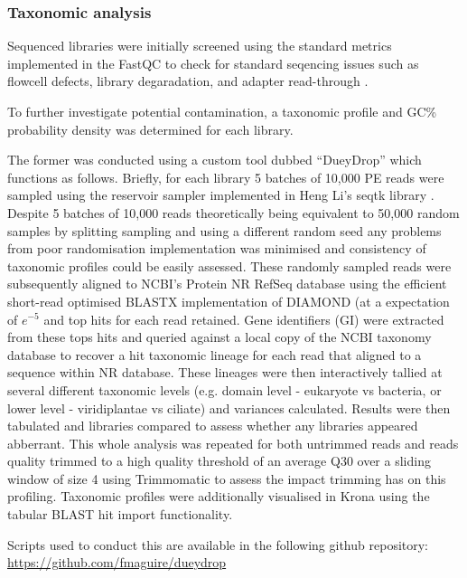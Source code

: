 \subsubsection{Taxonomic analysis}
Sequenced libraries were initially screened using the standard
metrics implemented in the FastQC to check for standard seqencing issues
such as flowcell defects, library degaradation, and adapter read-through \citep{fastqc}.

To further investigate potential contamination, a taxonomic
profile and GC\% probability density was determined for each library.

The former was conducted using a custom tool dubbed ``DueyDrop'' which functions as follows.
Briefly, for each library 5 batches of 10,000 PE reads were sampled 
using the reservoir sampler \citep{Vitter1985} implemented in Heng Li's seqtk library \citep{SeqtkGitHub}.
Despite 5 batches of 10,000 reads theoretically being equivalent to 50,000 random samples by splitting
sampling and using a different random seed any problems from poor randomisation implementation 
was minimised and consistency of taxonomic profiles could be easily assessed.
These randomly sampled reads were subsequently aligned to NCBI's Protein NR RefSeq database \citep{Pruitt2007}
using the efficient short-read optimised BLASTX implementation of DIAMOND \citep{Buchfink2015} (at a expectation
    of \(e^{-5}\) and top hits for each read retained.  Gene identifiers (GI) were extracted from these tops hits and queried against a
local copy of the NCBI taxonomy database \citep{Federhen2012} to recover a hit taxonomic lineage for each
read that aligned to a sequence within NR database. These lineages were then interactively tallied 
at several different taxonomic levels (e.g. domain level - eukaryote vs bacteria, or lower level - viridiplantae vs ciliate) and variances
calculated.  Results were then tabulated and libraries compared to assess whether any libraries appeared
abberrant.  This whole analysis was repeated for both untrimmed reads and reads quality trimmed
to a high quality threshold of an average Q30 over a sliding window of size 4 using
Trimmomatic \citep{Bolger2014a} to assess the impact trimming has on this profiling.
Taxonomic profiles were additionally visualised in Krona \citep{Ondov2011} using
the tabular BLAST hit import functionality.

Scripts used to conduct this are available in the following github repository:
\url{https://github.com/fmaguire/dueydrop}

